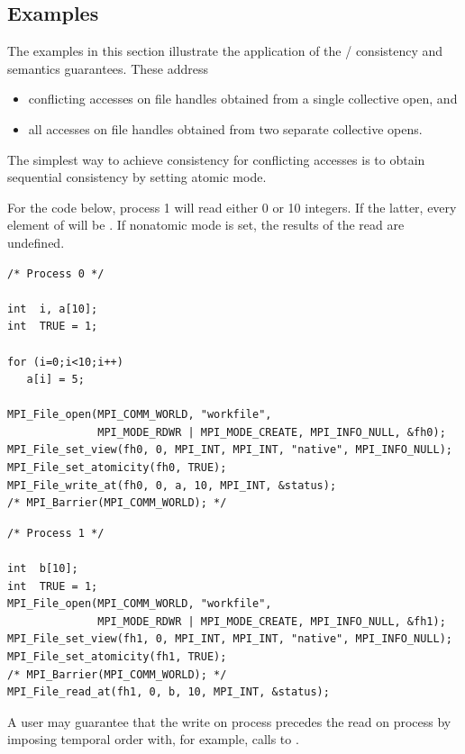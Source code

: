 \subsection{Examples}
\label{sec:io-consistency-examples}

The examples in this section illustrate
the application of the \MPI/ consistency and semantics guarantees.
These address
\begin{itemize}
\item   conflicting accesses on file handles obtained from a 
single collective open, and
\item   all accesses on file handles obtained from two separate
collective opens.
\end{itemize}

The simplest way to achieve consistency for conflicting accesses is
to obtain sequential consistency by setting atomic mode.
\begin{example}
\label{io-consistencyatomic}
For the code below,
process 1 will read either 0 or 10 integers.
If the latter, every element of  will be .
If nonatomic mode is set, the results of the read are undefined.

\begin{lstlisting}[language={[MPI]C}]
/* Process 0 */

int  i, a[10];
int  TRUE = 1;

for (i=0;i<10;i++)
   a[i] = 5;

MPI_File_open(MPI_COMM_WORLD, "workfile",
              MPI_MODE_RDWR | MPI_MODE_CREATE, MPI_INFO_NULL, &fh0);
MPI_File_set_view(fh0, 0, MPI_INT, MPI_INT, "native", MPI_INFO_NULL);
MPI_File_set_atomicity(fh0, TRUE);
MPI_File_write_at(fh0, 0, a, 10, MPI_INT, &status);
/* MPI_Barrier(MPI_COMM_WORLD); */
\end{lstlisting}
\begin{lstlisting}[language={[MPI]C}]
/* Process 1 */

int  b[10];
int  TRUE = 1;
MPI_File_open(MPI_COMM_WORLD, "workfile",
              MPI_MODE_RDWR | MPI_MODE_CREATE, MPI_INFO_NULL, &fh1);
MPI_File_set_view(fh1, 0, MPI_INT, MPI_INT, "native", MPI_INFO_NULL);
MPI_File_set_atomicity(fh1, TRUE);
/* MPI_Barrier(MPI_COMM_WORLD); */
MPI_File_read_at(fh1, 0, b, 10, MPI_INT, &status);
\end{lstlisting}
A user may guarantee that the write on process 
precedes the read on process  by imposing temporal order
with, for example, calls to .
\end{example}

